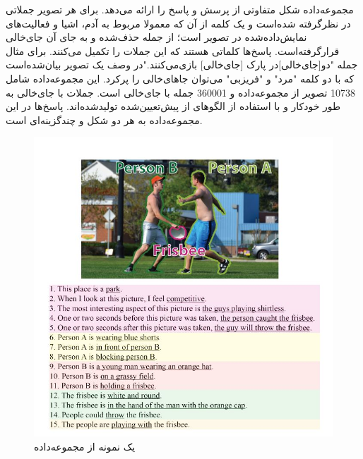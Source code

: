 	مجموعه‌داده 
	شکل متفاوتی از پرسش و پاسخ را ارائه می‌دهد. برای هر تصویر جملاتی در نظرگرفته شده‌است و یک کلمه از آن که معمولا مربوط به آدم، اشیا و  فعالیت‌های نمایش‌داده‌شده در تصویر است؛ از جمله حذف‌شده و به جای آن جای‌خالی قرار‌گرفته‌است. پاسخ‌ها کلماتی هستند که این جملات را تکمیل می‌کنند. برای مثال جمله "دو[جای‌خالی]در پارک [جای‌خالی] بازی‌می‌کنند."در وصف یک تصویر بیان‌شده‌است که با دو کلمه "مرد" و "فریزبی" می‌توان جاهای‌خالی‌ را پرکرد. این مجموعه‌داده شامل 10738 تصویر از مجموعه‌داده 
	\cite{lin2014microsoft}
	 و 360001 جمله با جای‌خالی است. جملات با جای‌خالی به طور خودکار و با استفاده از الگوهای از پیش‌تعیین‌شده تولیدشده‌اند. پاسخ‌ها در این مجموعه‌داده به هر دو شکل 
	و چند‌گزینه‌ای است.
  \begin{figure}[h]
	\centerline{\includegraphics[scale=0.5]{images/visualmadlibs.JPG}}
	\caption[یک نمونه از مجموعه‌داده ]{یک نمونه از مجموعه‌داده  \cite{yu2015visual}}
	\label{fig:visualmadlibsExample}
  \end{figure}

